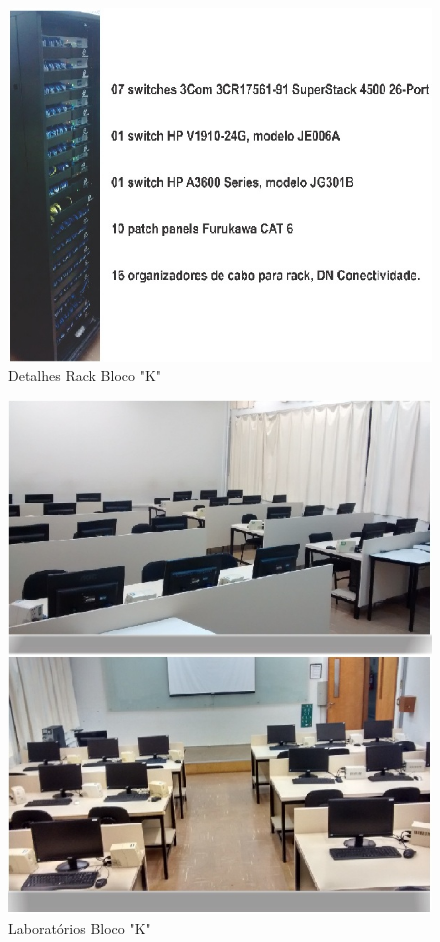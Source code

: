 \documentclass[	DIV=calc,%
							paper=a4,%
							fontsize=12pt,%
							onecolumn]{scrartcl}	 					%
\begin{document}
\begin{figure}[!h]
	\centering
	\caption{Detalhes Rack Bloco "K"}
	\includegraphics{rack_1}
\end{figure}
\begin{figure}[!h]
	\centering
	\caption{Laboratórios Bloco "K"}
	\includegraphics{laboratorios_1}
\end{figure}
\end{document}
